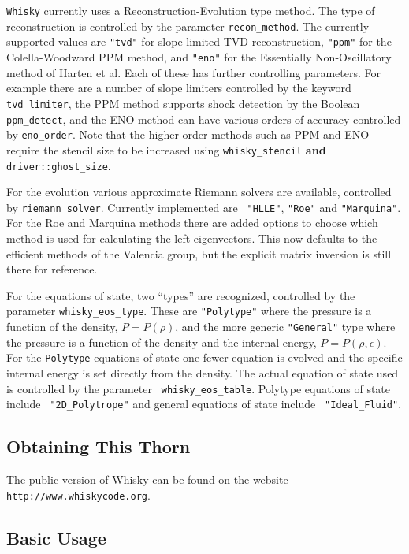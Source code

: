 \documentclass{article}
\begin{document}
{\tt Whisky} currently uses a Reconstruction-Evolution type method. The type
of reconstruction is controlled by the parameter {\tt recon\_method}.
The currently supported values are {\tt "tvd"} for slope limited TVD
reconstruction, {\tt "ppm"} for the Colella-Woodward PPM method, and
{\tt "eno"} for the Essentially Non-Oscillatory method of Harten et
al. Each of these has further controlling parameters. For example
there are a number of slope limiters controlled by the keyword {\tt
  tvd\_limiter}, the PPM method supports shock detection by the
Boolean {\tt ppm\_detect}, and the ENO method can have various orders
of accuracy controlled by {\tt eno\_order}. Note that the higher-order
methods such as PPM and ENO require the stencil size to be increased
using {\tt whisky\_stencil} {\bf and} {\tt driver::ghost\_size}.

For the evolution various approximate Riemann solvers are available,
controlled by {\tt riemann\_solver}. Currently implemented are {\tt
  "HLLE"}, {\tt "Roe"} and {\tt "Marquina"}. For the Roe and Marquina
methods there are added options to choose which method is used for
calculating the left eigenvectors. This now defaults to the efficient
methods of the Valencia group, but the explicit matrix inversion is
still there for reference.

For the equations of state, two ``types'' are recognized, controlled
by the parameter {\tt whisky\_eos\_type}. These are {\tt "Polytype"}
where the pressure is a function of the density, $P=P(\rho)$, and the
more generic {\tt "General"} type where the pressure is a function
of the density and the internal energy, $P=P(\rho, \epsilon)$. For the
{\tt Polytype} equations of state one fewer equation is evolved and
the specific internal energy is set directly from the density. The
actual equation of state used is controlled by the parameter {\tt
  whisky\_eos\_table}. Polytype equations of state include {\tt
  "2D\_Polytrope"} and general equations of state include {\tt
  "Ideal\_Fluid"}. 

\subsection{Obtaining This Thorn}

The public version of Whisky can be found on the
website {\tt http://www.whiskycode.org}.

\subsection{Basic Usage}
\end{document}
